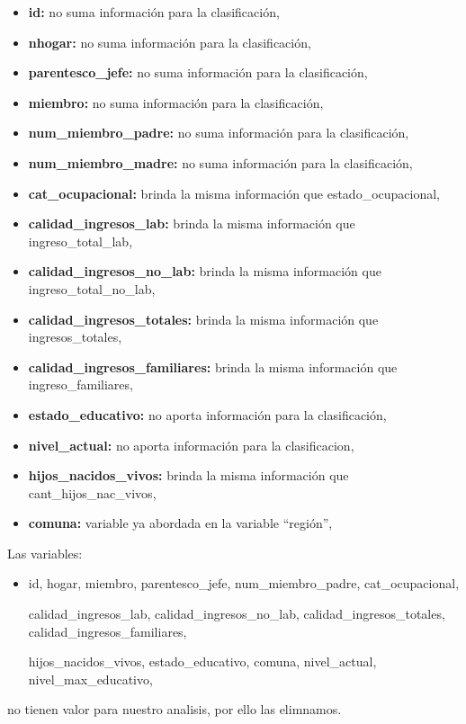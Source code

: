 \documentclass[a4paper]{article}
\begin{document}
            \begin{itemize}
                \item \textbf{id:} no suma información para la clasificación,
                \item \textbf{nhogar:} no suma información para la clasificación,
                \item \textbf{parentesco\_jefe:} no suma información para la clasificación,
                \item \textbf{miembro:} no suma información para la clasificación,
                \item \textbf{num\_miembro\_padre:} no suma información para la clasificación,
                \item \textbf{num\_miembro\_madre:} no suma información para la clasificación,
                \item \textbf{cat\_ocupacional:} brinda la misma información que estado\_ocupacional,
                \item \textbf{calidad\_ingresos\_lab:} brinda la misma información que ingreso\_total\_lab,
                \item \textbf{calidad\_ingresos\_no\_lab:} brinda la misma información que ingreso\_total\_no\_lab,
                \item \textbf{calidad\_ingresos\_totales:} brinda la misma información que ingresos\_totales,
                \item \textbf{calidad\_ingresos\_familiares:} brinda la misma información que ingreso\_familiares,
                \item \textbf{estado\_educativo:} no aporta información para la clasificación,
                \item \textbf{nivel\_actual:} no aporta información para la clasificacion,
                \item \textbf{hijos\_nacidos\_vivos:} brinda la misma información que cant\_hijos\_nac\_vivos,
                \item \textbf{comuna:} variable ya abordada en la variable ``región'',
            \end{itemize}
        
        Las variables: 
        \begin{itemize}
            \item id, hogar, miembro, parentesco\_jefe, num\_miembro\_padre, cat\_ocupacional, 
            
            calidad\_ingresos\_lab, calidad\_ingresos\_no\_lab, calidad\_ingresos\_totales, calidad\_ingresos\_familiares,
            
            hijos\_nacidos\_vivos, estado\_educativo, comuna, nivel\_actual, nivel\_max\_educativo,
        \end{itemize}
        no tienen valor para nuestro analisis, por ello las elimnamos.
\end{document}
